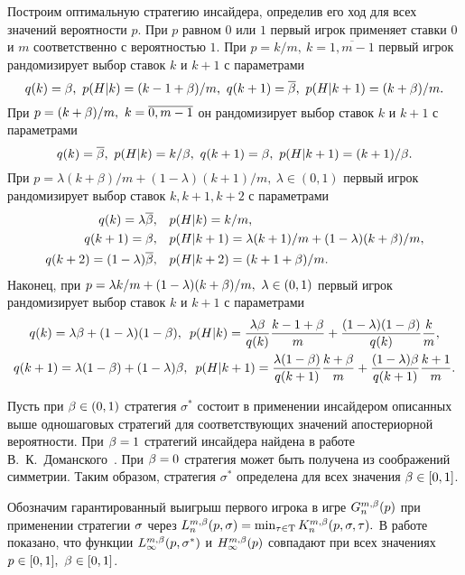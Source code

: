 Построим оптимальную стратегию инсайдера, определив его ход для всех значений вероятности $p$.
При $p$ равном $0$ или $1$ первый игрок применяет ставки $0$ и $m$ соответственно с вероятностью $1$.
При $p = k/m,\ k = \overline{1, m-1}$ первый игрок рандомизирует выбор ставок $k$ и $k+1$ с параметрами
\begin{equation*}
  q(k) = \beta,\ p(H|k) = (k-1+\beta)/m,\
  q(k+1) = {{\overline{\beta}}},\ p(H|k + 1) = (k+\beta)/m.
\end{equation*}
При $p = (k+\beta)/m,\ k = \overline{0, m-1}$ он рандомизирует выбор ставок $k$ и $k+1$ с параметрами
\begin{equation*}
  q(k) = {{\overline{\beta}}},\ p(H|k) = k/\beta,\
  q(k+1) = \beta,\ p(H|k+1) = (k+1)/\beta.
\end{equation*}
При $p = \lambda (k+\beta)/m + (1-\lambda) (k+1)/m,\ \lambda \in (0, 1)$ первый игрок рандомизирует выбор ставок $k, k+1, k+2$ с параметрами
\begin{align*}
  q(k) = \lambda{{\overline{\beta}}}, &\quad p(H|k) = k/m,\\
  q(k+1) = \beta, &\quad p(H|k+1) = \lambda (k+1)/m + (1-\lambda) (k+\beta)/m,\\
  q(k+2) = (1-\lambda){{\overline{\beta}}}, &\quad p(H|k+2) = (k+1+\beta)/m.
\end{align*}
Наконец, при $p = \lambda k/m + (1-\lambda) (k+\beta)/m,\ \lambda \in (0, 1)$ первый игрок рандомизирует выбор ставок $k$ и $k+1$ с параметрами
\begin{gather*}
  q(k) = \lambda\beta + (1-\lambda)(1-\beta),\enskip
  p(H|k) = \frac{\lambda\beta}{q(k)} \frac{k-1+\beta}{m} + \frac{(1-\lambda)(1-\beta)}{q(k)} \frac{k}{m},\\
  q(k+1) = \lambda(1-\beta) + (1-\lambda)\beta,\enskip
  p(H|k+1) = \frac{\lambda(1-\beta)}{q(k+1)} \frac{k+\beta}{m} + \frac{(1-\lambda)\beta}{q(k+1)} \frac{k+1}{m}.
\end{gather*}

Пусть при $\beta \in (0,1)$ стратегия $\sigma^*$ состоит в применении инсайдером описанных выше одношаговых стратегий для соответствующих значений апостериорной вероятности. 
При $\beta = 1$ стратегий инсайдера найдена в работе В.~К.~Доманского~\cite{domansky07}.
При $\beta = 0$ стратегия может быть получена из соображений симметрии. 
Таким образом, стратегия $\sigma^*$ определена для всех значения $\beta \in [0,1]$.

Обозначим гарантированный выигрыш первого игрока в игре $\theG*{n}(p)$ при применении стратегии $\sigma$ через
$
  \L*{n}(p, \sigmar) = \min_{\taur \in \Tau} \K*{n}(p,\sigmar,\taur).
$
В работе показано, что функции $\L*{\infty}(p, \sigmar^*)$ и $\H*{\infty}(p)$ совпадают при всех значениях $p \in [0,1],\ \beta \in [0,1]$.

